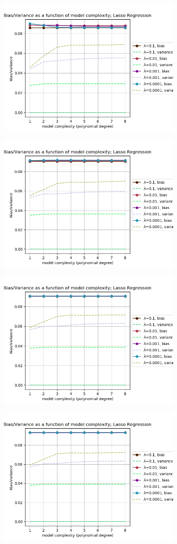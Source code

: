 \begin{figure}[!ht]
\begin{subfigure}{\textwidth}
  \centering
  \includegraphics[width=0.55\linewidth]{images/bias_var/fake_lasso_bv_p08_n10.png}
\end{subfigure}
\begin{subfigure}{\textwidth}
  \centering
  \includegraphics[width=0.55\linewidth]{images/bias_var/fake_lasso_bv_p08_n21.png}
\end{subfigure}
\begin{subfigure}{\textwidth}
  \centering
  \includegraphics[width=0.55\linewidth]{images/bias_var/fake_lasso_bv_p08_n50.png}
\end{subfigure}
\begin{subfigure}{\textwidth}
  \centering
  \includegraphics[width=0.55\linewidth]{images/bias_var/fake_lasso_bv_p08_n100.png}

\end{subfigure}
\end{figure}
